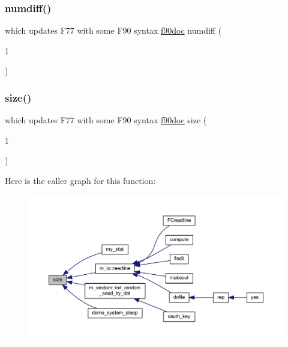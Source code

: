 \mbox{\label{what__overview_81_8txt_a7d9f0f7f68d767709cf298ae59490237}} 
\subsubsection{\texorpdfstring{numdiff()}{numdiff()}}
{\footnotesize\ttfamily which updates F77 with some F90 syntax \hyperlink{what__overview_81_8txt_aab2f56fdcdfab484c0d861985675a92f}{f90doc} numdiff (\begin{DoxyParamCaption}\item[{1}]{ }\end{DoxyParamCaption})}

\mbox{\label{what__overview_81_8txt_ab5692ed87074f1d5ec850a9ffa8b5af9}} 
\subsubsection{\texorpdfstring{size()}{size()}}
{\footnotesize\ttfamily which updates F77 with some F90 syntax \hyperlink{what__overview_81_8txt_aab2f56fdcdfab484c0d861985675a92f}{f90doc} size (\begin{DoxyParamCaption}\item[{1}]{ }\end{DoxyParamCaption})}

Here is the caller graph for this function\+:
\nopagebreak
\begin{figure}[H]
\begin{center}
\leavevmode
\includegraphics[width=350pt]{what__overview_81_8txt_ab5692ed87074f1d5ec850a9ffa8b5af9_icgraph}
\end{center}
\end{figure}
\mbox{\label{what__overview_81_8txt_a8cdf8efd1b900d6dce77a3f97edb2216}} 
